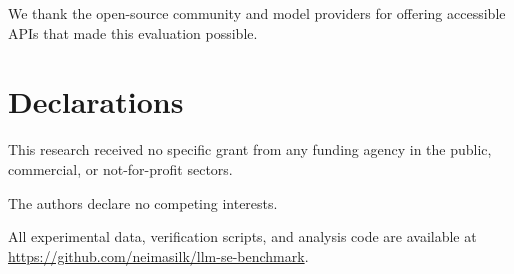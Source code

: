 \documentclass[pdflatex,sn-mathphys-num]{sn-jnl}
\begin{document}
\backmatter

We thank the open-source community and model providers for offering accessible
APIs that made this evaluation possible.

\section*{Declarations}

This research received no specific grant from any funding agency in the public,
commercial, or not-for-profit sectors.

The authors declare no competing interests.

All experimental data, verification scripts, and analysis code are available at
\url{https://github.com/neimasilk/llm-se-benchmark}.


\end{document}
